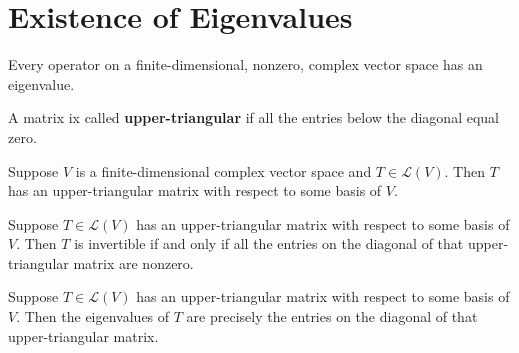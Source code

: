 \documentclass{memoir}
\begin{document}
\section{Existence of Eigenvalues}
\label{sec:existence_of_eigenvalues}
\begin{thm}
	Every operator on a finite-dimensional, nonzero, complex vector space has an eigenvalue.
\end{thm}
\begin{defn}
A matrix ix called \textbf{upper-triangular} if all the entries below the diagonal equal zero.
	
\end{defn}
\begin{thm}
	Suppose $V$ is a finite-dimensional complex vector space and $T\in \mathcal{L}(V)$. Then $T$ has an upper-triangular matrix with respect to some basis of $V$.
\end{thm}
\begin{thm}
	Suppose $T \in \mathcal{L}(V)$ has an upper-triangular matrix with respect to some basis of $V$. Then $T$ is invertible if and only if all the entries on the diagonal of that upper-triangular matrix are nonzero.
\end{thm}
\begin{thm}
	Suppose $T \in \mathcal{L}(V)$ has an upper-triangular matrix with respect to some basis of $V$. Then the eigenvalues of $T$ are precisely the entries on the diagonal of that upper-triangular matrix.
\end{thm}
\end{document}
